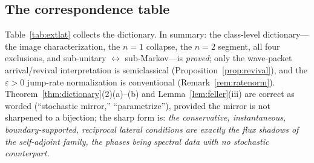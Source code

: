 \documentclass[11pt]{article}
\theoremstyle{definition}
\theoremstyle{remark}
\begin{document}
\subsection{The correspondence table}
\label{app:completions-table}

Table~\ref{tab:extlat} collects the dictionary. In summary: the
class-level dictionary---the image characterization, the $n=1$
collapse, the $n=2$ segment, all four exclusions, and sub-unitary
$\leftrightarrow$ sub-Markov---is \emph{proved}; only the wave-packet
arrival/revival interpretation is semiclassical
(Proposition~\ref{prop:revival}), and the $\varepsilon>0$ jump-rate
normalization is conventional (Remark~\ref{rem:ratenorm}).
Theorem~\ref{thm:dictionary}(2)(a)--(b) and Lemma~\ref{lem:feller}(iii)
are correct as worded (``stochastic mirror,'' ``parametrize''),
provided the mirror is not sharpened to a bijection; the sharp form is:
\emph{the conservative, instantaneous, boundary-supported, reciprocal
lateral conditions are exactly the flux shadows of the self-adjoint
family, the phases being spectral data with no stochastic counterpart.}
\end{document}
